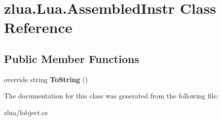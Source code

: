 \hypertarget{classzlua_1_1_lua_1_1_assembled_instr}{}\section{zlua.\+Lua.\+Assembled\+Instr Class Reference}
\label{classzlua_1_1_lua_1_1_assembled_instr}
\subsection*{Public Member Functions}
\begin{DoxyCompactItemize}
\item 
\mbox{\label{classzlua_1_1_lua_1_1_assembled_instr_a2feea9c53ce8c484656ff5e4285cd74d}} 
override string {\bfseries To\+String} ()
\end{DoxyCompactItemize}


The documentation for this class was generated from the following file\+:\begin{DoxyCompactItemize}
\item 
zlua/lobject.\+cs\end{DoxyCompactItemize}
